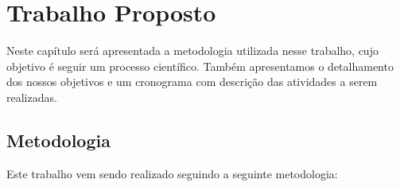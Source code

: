 \chapter{Trabalho Proposto}\label{chap3:proposal}

    Neste capítulo será apresentada a metodologia utilizada nesse trabalho, cujo objetivo é seguir um processo científico. Também apresentamos o detalhamento dos nossos objetivos e um cronograma com descrição das atividades a serem realizadas.

    \section{Metodologia}
       Este trabalho vem sendo realizado seguindo a seguinte metodologia: 
        
